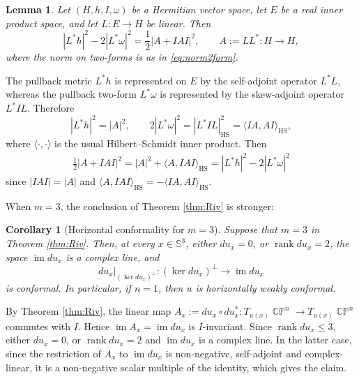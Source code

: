 \documentclass[11pt]{article}
\theoremstyle{plain}
\numberwithin{equation}{section}
\newtheorem{lemma}[theorem]{Lemma}
\newtheorem{corollary}[theorem]{Corollary}
\theoremstyle{definition}
\let\oldendproof\endproof
\renewenvironment{proof}[1][\proofname]{%
\oldproof[\upshape \bfseries #1]%
}{\oldendproof}
\def \mb{\mathbb}
\DeclareMathOperator{\CP}{\mathbb{CP}}
\begin{document}
\begin{lemma}
Let $(H,h,I,\omega)$ be a Hermitian vector space, let $E$ be a real
inner product space, and let $L\colon E\to H$ be linear.   Then
\begin{equation}
    \label{eq:PHWCLinearAlgebra}
    |L^*h|^2-2|L^*\omega|^2
    =\frac12|A+IAI|^2,\qquad A:=L L^*\colon H\to H,
\end{equation}
where the norm on two-forms is as in \eqref{eq:norm2form}.
\end{lemma}

\begin{proof}
The pullback metric $L^*h$ is represented on $E$ by the self-adjoint
operator $L^* L$, whereas the pullback two-form $L^*\omega$ is
represented by the skew-adjoint operator $L^* I L$.  Therefore
\[
|L^*h|^2=|A|^2,
\qquad
2|L^*\omega|^2
=|L^* I L|_{\mathrm{HS}}^2
=\langle IA,AI\rangle_{\mathrm{HS}},
\]
where $\langle\cdot,\cdot\rangle$ is the usual Hilbert--Schmidt inner product.
Then
\begin{align*}
\frac12|A+IAI|^2
=|A|^2+\langle A,IAI\rangle_{\mathrm{HS}}=|L^*h|^2-2|L^*\omega|^2
\end{align*}
since $|IAI|=|A|$ and
$\langle A,IAI\rangle_{\mathrm{HS}}
=-\langle IA,AI\rangle_{\mathrm{HS}}$.
\end{proof}

When $m=3$, the conclusion of Theorem \ref{thm:Riv} is stronger:

\begin{corollary}[Horizontal conformality for $m=3$]\label{cor:HWC}
Suppose that $m=3$ in Theorem \ref{thm:Riv}. Then, at every $x\in\mb S^3$, either $du_x=0$, or
$\operatorname{rank}du_x=2$, the space $\operatorname{im}du_x$ is a complex
line, and
\[
    du_x\big|_{(\ker du_x)^\perp}\colon
    (\ker du_x)^\perp\longrightarrow\operatorname{im}du_x
\]
is conformal.  In particular, if $n=1$, then $u$ is horizontally weakly
conformal.
\end{corollary}

\begin{proof}
By Theorem \ref{thm:Riv}, the linear map
$    A_x:=du_x\circ du_x^*\colon T_{u(x)}\CP^n\to T_{u(x)}\CP^n$
commutes with $I$.  Hence $\operatorname{im}A_x=\operatorname{im}du_x$ is
$I$-invariant.  Since $\operatorname{rank}du_x\leq3$, either $du_x=0$, or
$\operatorname{rank}du_x=2$ and $\operatorname{im}du_x$ is a complex line.
In the latter case, since the restriction of $A_x$ to $\operatorname{im}du_x$ is
non-negative, self-adjoint and complex-linear, it is a non-negative scalar multiple of the
identity, which gives the claim.
\end{proof}
\end{document}
